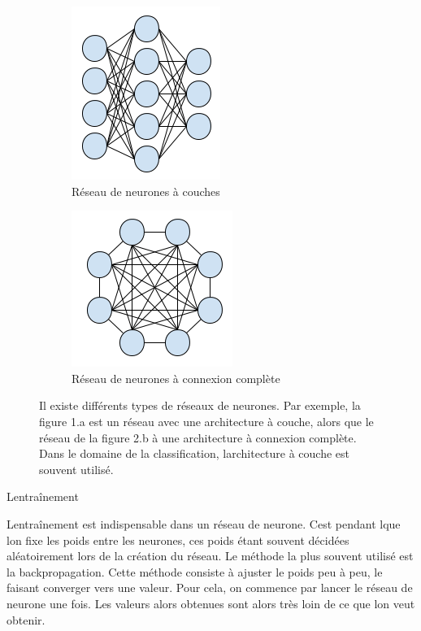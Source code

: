 \documentclass[11pt]{sdm}
\begin{document}
			\begin{figure}[!ht]
				\centering
				\begin{subfigure}{0.45\textwidth}
					\centering	
					\includegraphics[scale=0.7,natwidth=183,natheight=213]{figures/neuralNetworkLayers.png}
					\caption{R\'eseau de neurones \`a couches}
					\label{fig:nnl}
				\end{subfigure}
				\hspace*{\fill}
				\begin{subfigure}{0.45\textwidth}	
					\centering
					\includegraphics[scale=0.7,natwidth=198,natheight=192]{figures/neuralNetworkCompleteConnexion.png}
					\caption{R\'eseau de neurones \`a connexion compl\`ete}
					\label{fig:nnc}
				\end{subfigure}
				\caption{Il existe diff\'erents types de r\'eseaux de neurones. Par exemple, la figure 1.a est un r\'eseau avec une architecture \`a couche, alors que le r\'eseau de la figure 2.b \`a une architecture \`a connexion compl\`ete. Dans le domaine de la classification, l\textquotesingle architecture \`a couche est souvent utilis\'e.}
				\label{fig:neuralNetwork}
			\end{figure}

			\medbreak
			\begin{itshape}L\textquotesingle entra\^inement\end{itshape}
			\smallbreak
			L\textquotesingle entra\^inement est indispensable dans un r\'eseau de neurone. C\textquotesingle est pendant l\textquotesingle que l\textquotesingle on fixe les poids entre les neurones, ces poids \'etant souvent d\'ecid\'ees al\'eatoirement lors de la cr\'eation du r\'eseau. Le m\'ethode la plus souvent utilis\'e est la backpropagation. Cette m\'ethode consiste \`a ajuster le poids peu \`a peu, le faisant converger vers une valeur. Pour cela, on commence par lancer le r\'eseau de neurone une fois. Les valeurs alors obtenues sont alors tr\`es loin de ce que l\textquotesingle on veut obtenir. 
			\medbreak
\end{document}
